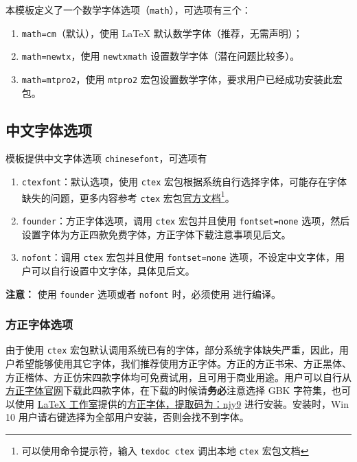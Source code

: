 \documentclass[cn,hazy,blue,10.5pt,normal]{elegantnote}
\begin{document}
本模板定义了一个数学字体选项（\lstinline{math}），可选项有三个：
\begin{enumerate}
  \item \lstinline{math=cm}（默认），使用 \LaTeX{} 默认数学字体（推荐，无需声明）；
  \item \lstinline{math=newtx}，使用 \lstinline{newtxmath} 设置数学字体（潜在问题比较多）。
  \item \lstinline{math=mtpro2}，使用 \lstinline{mtpro2} 宏包设置数学字体，要求用户已经成功安装此宏包。
\end{enumerate}


\subsection{中文字体选项}
模板提供中文字体选项 \lstinline{chinesefont}，可选项有
\begin{enumerate}
\item \lstinline{ctexfont}：默认选项，使用 \lstinline{ctex} 宏包根据系统自行选择字体，可能存在字体缺失的问题，更多内容参考 \lstinline{ctex} 宏包\href{https://ctan.org/pkg/ctex}{官方文档}\footnote{可以使用命令提示符，输入 \lstinline{texdoc ctex} 调出本地 \lstinline{ctex} 宏包文档}。
\item \lstinline{founder}：方正字体选项，调用 \lstinline{ctex} 宏包并且使用 \lstinline{fontset=none} 选项，然后设置字体为方正四款免费字体，方正字体下载注意事项见后文。
\item \lstinline{nofont}：调用 \lstinline{ctex} 宏包并且使用 \lstinline{fontset=none} 选项，不设定中文字体，用户可以自行设置中文字体，具体见后文。
\end{enumerate}

\noindent \textbf{注意：} 使用 \lstinline{founder} 选项或者 \lstinline{nofont} 时，必须使用  进行编译。

\subsubsection{方正字体选项}
由于使用 \lstinline{ctex} 宏包默认调用系统已有的字体，部分系统字体缺失严重，因此，用户希望能够使用其它字体，我们推荐使用方正字体。方正的{\songti 方正书宋}、{\heiti 方正黑体}、{\kaishu 方正楷体}、{\fangsong 方正仿宋}四款字体均可免费试用，且可用于商业用途。用户可以自行从\href{http://www.foundertype.com/}{方正字体官网}下载此四款字体，在下载的时候请\textbf{务必}注意选择 GBK 字符集，也可以使用 \href{https://www.latexstudio.net/}{\LaTeX{} 工作室}提供的\href{https://pan.baidu.com/s/1BgbQM7LoinY7m8yeP25Y7Q}{方正字体，提取码为：njy9} 进行安装。安装时，{\kaishu Win 10 用户请右键选择为全部用户安装，否则会找不到字体。}
\end{document}
